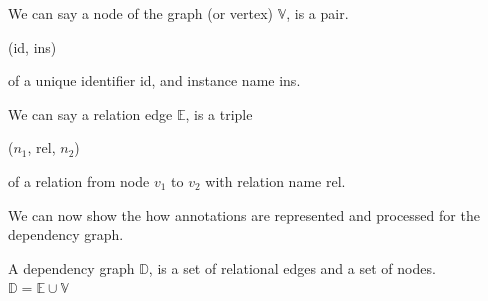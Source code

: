 \begin{defin}[Nodes] We can say a node of the graph (or vertex) $\mathbb{V}$, is
a pair.
\begin{center}
(id, ins)
\end{center}
of a unique identifier id, and instance name ins.
\end{defin}

\begin{defin} We can say a relation edge $\mathbb{E}$, is a
triple
\begin{center}
($n_{1}$, rel, $n_{2}$)
\end{center}
of a relation from node $v_{1}$ to $v_{2}$ with relation name rel.
\end{defin}

We can now show the how annotations are represented and processed for the
dependency graph.

\begin{defin} A dependency graph $\mathbb{D}$, is a set of
relational edges and a set of nodes.\\
$\mathbb{D} = \mathbb{E} \cup \mathbb{V}$
\end{defin}

